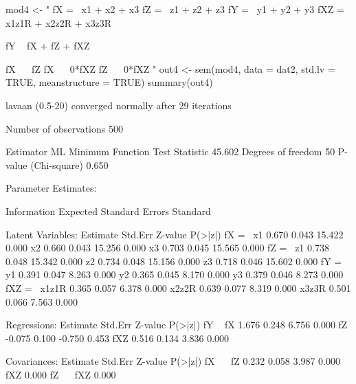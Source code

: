 \begin{Schunk}
\begin{Sinput}
 mod4 <- "
 fX =~ x1 + x2 + x3
 fZ =~ z1 + z2 + z3
 fY =~ y1 + y2 + y3
 fXZ =~ x1z1R + x2z2R + x3z3R
 
 fY ~ fX + fZ + fXZ
 
 fX ~~ fZ
 fX ~~ 0*fXZ
 fZ ~~ 0*fXZ
 "
 out4 <- 
     sem(mod4, data = dat2, std.lv = TRUE, meanstructure = TRUE)
 summary(out4)
\end{Sinput}
\begin{Soutput}
lavaan (0.5-20) converged normally after  29 iterations

  Number of observations                           500

  Estimator                                         ML
  Minimum Function Test Statistic               45.602
  Degrees of freedom                                50
  P-value (Chi-square)                           0.650

Parameter Estimates:

  Information                                 Expected
  Standard Errors                             Standard

Latent Variables:
                   Estimate  Std.Err  Z-value  P(>|z|)
  fX =~                                               
    x1                0.670    0.043   15.422    0.000
    x2                0.660    0.043   15.256    0.000
    x3                0.703    0.045   15.565    0.000
  fZ =~                                               
    z1                0.738    0.048   15.342    0.000
    z2                0.734    0.048   15.156    0.000
    z3                0.718    0.046   15.602    0.000
  fY =~                                               
    y1                0.391    0.047    8.263    0.000
    y2                0.365    0.045    8.170    0.000
    y3                0.379    0.046    8.273    0.000
  fXZ =~                                              
    x1z1R             0.365    0.057    6.378    0.000
    x2z2R             0.639    0.077    8.319    0.000
    x3z3R             0.501    0.066    7.563    0.000

Regressions:
                   Estimate  Std.Err  Z-value  P(>|z|)
  fY ~                                                
    fX                1.676    0.248    6.756    0.000
    fZ               -0.075    0.100   -0.750    0.453
    fXZ               0.516    0.134    3.836    0.000

Covariances:
                   Estimate  Std.Err  Z-value  P(>|z|)
  fX ~~                                               
    fZ                0.232    0.058    3.987    0.000
    fXZ               0.000                           
  fZ ~~                                               
    fXZ               0.000                           


\end{Soutput}
\end{Schunk}
